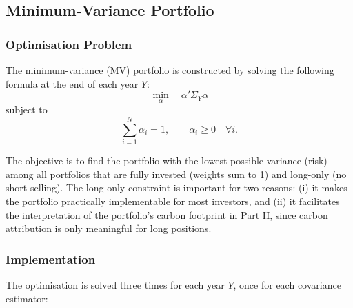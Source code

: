 \documentclass[11pt,a4paper]{article}
\begin{document}
\subsection{Minimum-Variance Portfolio}

\subsubsection{Optimisation Problem}

The minimum-variance (MV) portfolio is constructed by solving the following formula at the end of each year \(Y\):
\begin{equation}
\min_{\alpha} \quad \alpha' \Sigma_Y \alpha
\end{equation}
subject to
\begin{equation}
\sum_{i=1}^{N} \alpha_i = 1, \qquad \alpha_i \geq 0 \quad \forall i.
\end{equation}

The objective is to find the portfolio with the lowest possible variance (risk) among all portfolios that are fully invested (weights sum to 1) and long-only (no short selling). The long-only constraint is important for two reasons: (i) it makes the portfolio practically implementable for most investors, and (ii) it facilitates the interpretation of the portfolio's carbon footprint in Part II, since carbon attribution is only meaningful for long positions. 

\newpage

\subsubsection{Implementation}

The optimisation is solved three times for each year \(Y\), once for each covariance estimator:
\end{document}
